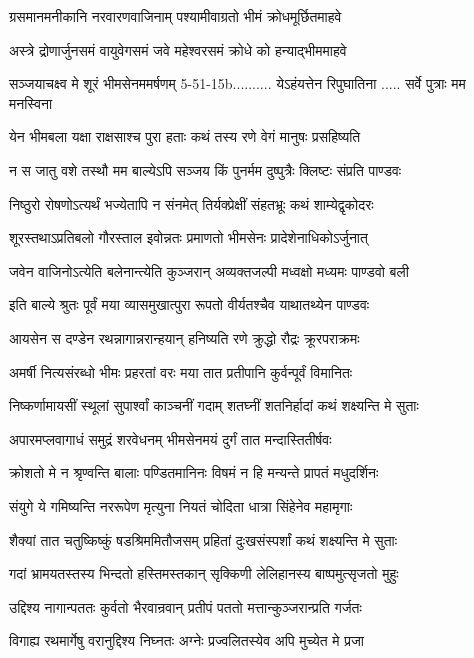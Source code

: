 \twolineshloka
{ग्रसमानमनीकानि नरवारणवाजिनाम्}
{पश्यामीवाग्रतो भीमं क्रोधमूर्छितमाहवे}


\twolineshloka
{अस्त्रे द्रोणार्जुनसमं वायुवेगसमं जवे}
{महेश्वरसमं क्रोधे को हन्याद्भीममाहवे}


\threelineshloka
{सञ्जयाचक्ष्व मे शूरं भीमसेनममर्षणम्}
{5-51-15b.......... येऽहंयत्तेन रिपुघातिना}
{..... सर्वे पुत्राः मम मनस्विना}


\twolineshloka
{येन भीमबला यक्षा राक्षसाश्च पुरा हताः}
{कथं तस्य रणे वेगं मानुषः प्रसहिष्यति}


\twolineshloka
{न स जातु वशे तस्थौ मम बाल्येऽपि सञ्जय}
{किं पुनर्मम दुष्पुत्रैः क्लिष्टः संप्रति पाण्डवः}


\twolineshloka
{निष्ठुरो रोषणोऽत्यर्थं भज्येतापि न संनमेत्}
{तिर्यक्प्रेक्षीं संहतभ्रूः कथं शाम्येद्वृकोदरः}


\twolineshloka
{शूरस्तथाऽप्रतिबलो गौरस्ताल इवोन्नतः}
{प्रमाणतो भीमसेनः प्रादेशेनाधिकोऽर्जुनात्}


\twolineshloka
{जवेन वाजिनोऽत्येति बलेनान्त्येति कुञ्जरान्}
{अव्यक्तजल्पी मध्वक्षो मध्यमः पाण्डवो बली}


\twolineshloka
{इति बाल्ये श्रुतः पूर्वं मया व्यासमुखात्पुरा}
{रूपतो वीर्यतश्चैव याथातथ्येन पाण्डवः}


\twolineshloka
{आयसेन स दण्डेन रथन्नागान्नरान्हयान्}
{हनिष्यति रणे क्रुद्धो रौद्रः क्रूरपराक्रमः}


\twolineshloka
{अमर्षी नित्यसंरब्धो भीमः प्रहरतां वरः}
{मया तात प्रतीपानि कुर्वन्पूर्वं विमानितः}


\twolineshloka
{निष्कर्णामायसीं स्थूलां सुपार्श्वां काञ्चनीं गदाम्}
{शतघ्नीं शतनिर्हादां कथं शक्ष्यन्ति मे सुताः}


\twolineshloka
{अपारमप्लवागाधं समुद्रं शरवेधनम्}
{भीमसेनमयं दुर्गं तात मन्दास्तितीर्षवः}


\twolineshloka
{क्रोशतो मे न श्रृण्वन्ति बालाः पण्डितमानिनः}
{विषमं न हि मन्यन्ते प्रापतं मधुदर्शिनः}


\twolineshloka
{संयुगे ये गमिष्यन्ति नररूपेण मृत्युना}
{नियतं चोदिता धात्रा सिंहेनेव महामृगाः}


\twolineshloka
{शैक्यां तात चतुष्किष्कुं षडश्रिममितौजसम्}
{प्रहितां दुःखसंस्पर्शां कथं शक्ष्यन्ति मे सुताः}


\twolineshloka
{गदां भ्रामयतस्तस्य भिन्दतो हस्तिमस्तकान्}
{सृक्किणी लेलिहानस्य बाष्पमुत्सृजतो मुहुः}


\twolineshloka
{उद्दिश्य नागान्पततः कुर्वतो भैरवान्रवान्}
{प्रतीपं पततो मत्तान्कुञ्जरान्प्रति गर्जतः}


\twolineshloka
{विगाह्य रथमार्गेषु वरानुद्दिश्य निघ्नतः}
{अग्नेः प्रज्वलितस्येव अपि मुच्येत मे प्रजा}


